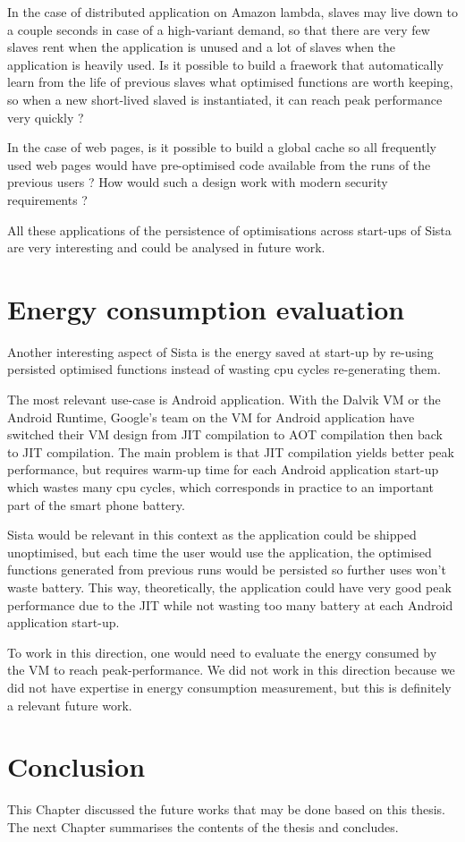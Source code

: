 \documentclass[a4paper,12pt,twoside]{../includes/ThesisStyle}
\begin{document}
In the case of distributed application on Amazon lambda, slaves may live down to a couple seconds in case of a high-variant demand, so that there are very few slaves rent when the application is unused and a lot of slaves when the application is heavily used. Is it possible to build a fraework that automatically learn from the life of previous slaves what optimised functions are worth keeping, so when a new short-lived slaved is instantiated, it can reach peak performance very quickly ?

In the case of web pages, is it possible to build a global cache so all frequently used web pages would have pre-optimised code available from the runs of the previous users ? How would such a design work with modern security requirements ?

All these applications of the persistence of optimisations across start-ups of Sista are very interesting and could be analysed in future work.

\section{Energy consumption evaluation}
\label{sec:energy}

Another interesting aspect of Sista is the energy saved at start-up by re-using persisted optimised functions instead of wasting cpu cycles re-generating them. 

The most relevant use-case is Android application. With the Dalvik VM or the Android Runtime, Google's team on the VM for Android application have switched their VM design from JIT compilation to AOT compilation then back to JIT compilation. The main problem is that JIT compilation yields better peak performance, but requires warm-up time for each Android application start-up which wastes many cpu cycles, which corresponds in practice to an important part of the smart phone battery.

Sista would be relevant in this context as the application could be shipped unoptimised, but each time the user would use the application, the optimised functions generated from previous runs would be persisted so further uses won't waste battery. This way, theoretically, the application could have very good peak performance due to the JIT while not wasting too many battery at each Android application start-up.

To work in this direction, one would need to evaluate the energy consumed by the VM to reach peak-performance. We did not work in this direction because we did not have expertise in energy consumption measurement, but this is definitely a relevant future work.

\section*{Conclusion}

This Chapter discussed the future works that may be done based on this thesis. The next Chapter summarises the contents of the thesis and concludes.

\ifx\wholebook\relax\else
    
\end{document}
